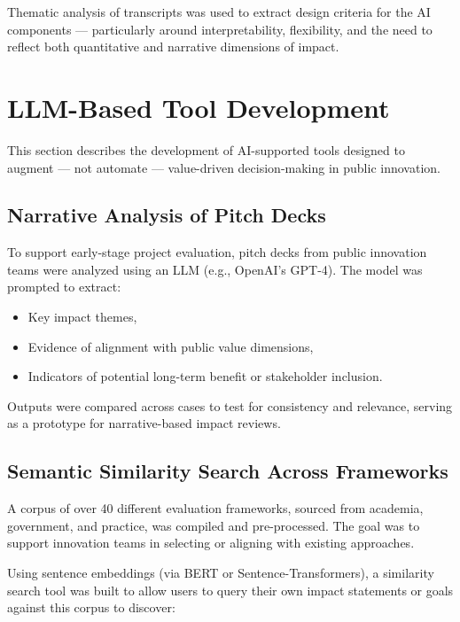 Thematic analysis of transcripts was used to extract design criteria for the AI components — particularly around interpretability, flexibility, and the need to reflect both quantitative and narrative dimensions of impact.

\section{LLM-Based Tool Development}\label{sec:llm-based-tool-development}

This section describes the development of AI-supported tools designed to augment — not automate — value-driven decision-making in public innovation.

\subsection{Narrative Analysis of Pitch Decks}\label{subsec:narrative-analysis-of-pitch-decks}

To support early-stage project evaluation, pitch decks from public innovation teams were analyzed using an LLM (e.g., OpenAI’s GPT-4).
The model was prompted to extract:

\begin{itemize}
    \item Key impact themes,
    \item Evidence of alignment with public value dimensions,
    \item Indicators of potential long-term benefit or stakeholder inclusion.
\end{itemize}

Outputs were compared across cases to test for consistency and relevance, serving as a prototype for narrative-based impact reviews.

\subsection{Semantic Similarity Search Across Frameworks}\label{subsec:semantic-similarity-search-across-frameworks}

A corpus of over 40 different evaluation frameworks, sourced from academia, government, and practice, was compiled and pre-processed.
The goal was to support innovation teams in selecting or aligning with existing approaches.

Using sentence embeddings (via BERT or Sentence-Transformers), a similarity search tool was built to allow users to query their own impact statements or goals against this corpus to discover:


